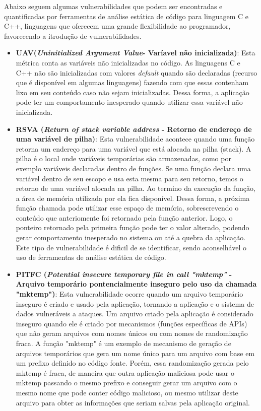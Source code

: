 %
Abaixo seguem algumas vulnerabilidades que podem ser encontradas e quantificadas por ferramentas de análise estática de código para linguagem C e C++, linguagens que oferecem uma grande flexibilidade ao programador, favorecendo a itrodução de vulnerabilidades.

\begin{itemize}

\item \textbf{UAV(\emph{Uninitialized Argument Value}- Varíavel não inicializada)}:
%
Esta métrica conta as variáveis não inicializadas no código. As linguagens C e C++ não são inicializadas com valores \emph{default} quando são declaradas (recurso que é disponível em algumas linguagens) fazendo com que essas contenham lixo em seu conteúdo caso não sejam inicializadas. Dessa forma, a aplicação pode ter um comportamento inesperado quando utilizar essa variável não inicializada.

\item \textbf{ RSVA (\emph{Return of stack variable address} - Retorno de endereço de uma variável de pilha)}:
%
Esta vulnerabilidade acontece quando uma função retorna um endereço para uma variável que está alocada na pilha (stack). A pilha é o local onde variáveis temporárias são armazenadas, como por exemplo variáveis declaradas dentro de funções. Se uma função declara uma variável dentro de seu escopo e usa esta mesma para seu retorno, temos o retorno de uma variável alocada na pilha. Ao termino da execução da função, a área de memória utilizada por ela fica disponível. Dessa forma, a próxima função chamada pode utilizar esse espaço de memória, sobrescrevendo o conteúdo que anteriomente foi retornado pela função anterior. Logo, o ponteiro retornado pela primeira função pode ter o valor alterado, podendo gerar comportamento inesperado no sistema ou até a quebra da aplicação. Este tipo de vulnerabilidade é dificil de se identificar, sendo aconselhável o uso de ferramentas de análise estática de código.

\item \textbf{PITFC (\emph{Potential insecure temporary file in call "mktemp" } - Arquivo temporário pontencialmente inseguro pelo uso da chamada "mktemp")}:
%
Esta vulnerabilidade ocorre quando um arquivo temporário inseguro é criado e usado pela aplicação, tornando a aplicação e o sistema de dados vulneráveis a ataques. Um arquivo criado pela aplicação é considerado inseguro quando ele é criado por mecanismos (funções específicas de APIs) que não geram arquivos com nomes únicos ou com nomes de randomização fraca. A função "mktemp" é um exemplo de mecanismo de geração de arquivos temporários que gera um nome único para um arquivo com base em um prefixo definido no código fonte. Porém, essa randomização gerada pelo mktemp é fraca, de maneira que outra aplicação maliciosa pode usar o mktemp passando o mesmo prefixo e conseguir gerar um arquivo com o mesmo nome que pode conter código malicioso, ou mesmo utilizar deste arquivo para obter as informações que seriam salvas pela aplicação original.


\end{itemize}
